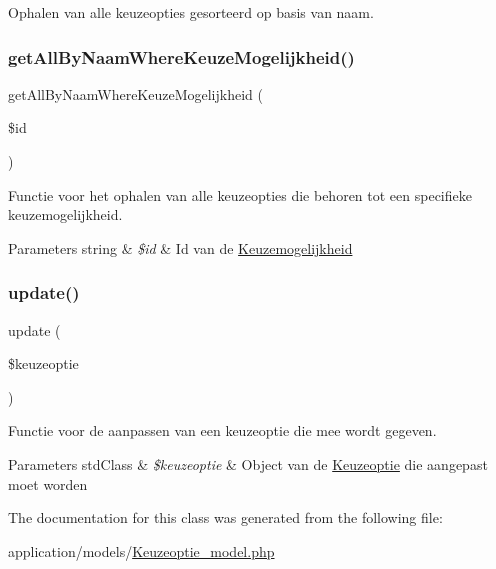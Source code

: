 Ophalen van alle keuzeopties gesorteerd op basis van naam. 

\mbox{\label{class_keuzeoptie___model_a6f3e4d26ab480501524eabb01683f5f7}} 
\subsubsection{\texorpdfstring{get\+All\+By\+Naam\+Where\+Keuze\+Mogelijkheid()}{getAllByNaamWhereKeuzeMogelijkheid()}}
{\footnotesize\ttfamily get\+All\+By\+Naam\+Where\+Keuze\+Mogelijkheid (\begin{DoxyParamCaption}\item[{}]{\$id }\end{DoxyParamCaption})}

Functie voor het ophalen van alle keuzeopties die behoren tot een specifieke keuzemogelijkheid. 
\begin{DoxyParams}[1]{Parameters}
string & {\em \$id} & Id van de \mbox{\hyperlink{class_keuzemogelijkheid}{Keuzemogelijkheid}} \\
\hline
\end{DoxyParams}
\mbox{\label{class_keuzeoptie___model_a9d98d1a6c3919a0e7b946d37fa385948}} 
\subsubsection{\texorpdfstring{update()}{update()}}
{\footnotesize\ttfamily update (\begin{DoxyParamCaption}\item[{}]{\$keuzeoptie }\end{DoxyParamCaption})}

Functie voor de aanpassen van een keuzeoptie die mee wordt gegeven. 
\begin{DoxyParams}[1]{Parameters}
std\+Class & {\em \$keuzeoptie} & Object van de \mbox{\hyperlink{class_keuzeoptie}{Keuzeoptie}} die aangepast moet worden \\
\hline
\end{DoxyParams}


The documentation for this class was generated from the following file\+:\begin{DoxyCompactItemize}
\item 
application/models/\mbox{\hyperlink{_keuzeoptie__model_8php}{Keuzeoptie\+\_\+model.\+php}}\end{DoxyCompactItemize}
